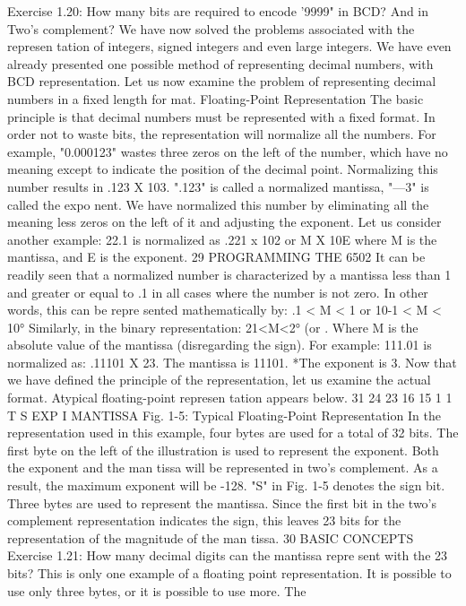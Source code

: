 Exercise 1.20: How many bits are required to encode '9999" in BCD?
And in Two's complement?
We have now solved the problems associated with the represen
tation of integers, signed integers and even large integers. We
have even already presented one possible method of representing
decimal numbers, with BCD representation. Let us now examine
the problem of representing decimal numbers in a fixed length for
mat.
Floating-Point Representation
The basic principle is that decimal numbers must be represented
with a fixed format. In order not to waste bits, the representation
will normalize all the numbers.
For example, "0.000123" wastes three zeros on the left of the
number, which have no meaning except to indicate the position of
the decimal point. Normalizing this number results in .123 X 103.
".123" is called a normalized mantissa, "—3" is called the expo
nent. We have normalized this number by eliminating all the meaning
less zeros on the left of it and adjusting the exponent.
Let us consider another example:
22.1 is normalized as .221 x 102
or M X 10E where M is the mantissa, and E is the exponent.
29
PROGRAMMING THE 6502
It can be readily seen that a normalized number is characterized
by a mantissa less than 1 and greater or equal to .1 in all cases
where the number is not zero. In other words, this can be repre
sented mathematically by:
.1 < M < 1 or 10-1 < M < 10°
Similarly, in the binary representation:
21<M<2° (or .
Where M is the absolute value of the mantissa (disregarding the
sign).
For example:
111.01 is normalized as: .11101 X 23.
The mantissa is 11101.
*The exponent is 3.
Now that we have defined the principle of the representation,
let us examine the actual format. Atypical floating-point represen
tation appears below.
31 24 23 16 15
1 1 T
S EXP
I
MANTISSA
Fig. 1-5: Typical Floating-Point Representation
In the representation used in this example, four bytes are used
for a total of 32 bits. The first byte on the left of the illustration is
used to represent the exponent. Both the exponent and the man
tissa will be represented in two's complement. As a result, the
maximum exponent will be -128. "S" in Fig. 1-5 denotes the sign
bit.
Three bytes are used to represent the mantissa. Since the first
bit in the two's complement representation indicates the sign, this
leaves 23 bits for the representation of the magnitude of the man
tissa.
30
BASIC CONCEPTS
Exercise 1.21: How many decimal digits can the mantissa repre
sent with the 23 bits?
This is only one example of a floating point representation. It is
possible to use only three bytes, or it is possible to use more. The
